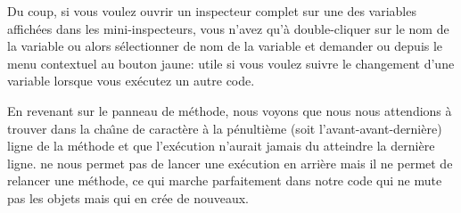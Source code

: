 \documentclass[a4paper,10pt,twoside]{book}
\begin{document}

Du coup, si vous voulez ouvrir un inspecteur complet sur une des variables
affich\'ees dans les mini-inspecteurs, vous n'avez qu'\`a double-cliquer
sur le nom de la variable ou alors s\'electionner de nom de la variable et 
demander 
  ou 
depuis le menu contextuel au bouton jaune:
utile si vous voulez suivre 
le changement d'une variable lorsque vous ex\'ecutez un autre code.

En revenant sur le panneau de m\'ethode, nous voyons que nous
nous attendions \`a trouver  dans la cha\^{\i}ne de caract\`ere
 \`a la p\'enulti\`eme (soit l'avant-avant-derni\`ere) 
ligne de la m\'ethode et que l'ex\'ecution n'aurait jamais du atteindre
la derni\`ere ligne.
\sq ne nous permet pas de lancer une ex\'ecution en arri\`ere mais
il ne permet de relancer une m\'ethode, ce qui marche parfaitement dans
notre code qui ne mute pas les objets mais qui en cr\'ee de nouveaux.

\end{document}
